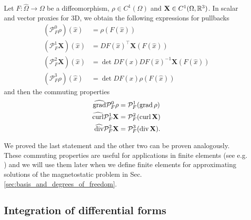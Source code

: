 \documentclass[../master_thesis.tex]{subfiles}
\begin{document}
\begin{proposition}\label{prop:pullback_and_commutativity_3D}
    Let $F: \hat{\Omega} \rightarrow \Omega$ be a diffeomorphism, 
    $\rho \in C^1(\Omega)$ and $\mathbf{X} \in C^1(\Omega, \mathbb{R}^3)$.
    In scalar and vector proxies for 3D, we obtain the following expressions for 
    pullbacks
    \begin{align*}
        (\mathcal{P}^0_F \rho)(\hat{x}) &= \rho(F(\hat{x}))
        \\ (\mathcal{P}^1_F \mathbf{X})(\hat{x}) &= DF(\hat{x})^\top \mathbf{X}(F(\hat{x}))
        \\ (\mathcal{P}^2_F \mathbf{X})(\hat{x}) &= \det DF(\hat{x}) DF(\hat{x})^{-1} \mathbf{X}(F(\hat{x}))
        \\ (\mathcal{P}^3_F \rho)(\hat{x}) &= \det DF(\hat{x}) \rho(F(\hat{x}))
    \end{align*}
    and then the commuting properties
    \begin{align*}
        \widehat{\operatorname{grad}} \mathcal{P}^0_F \rho &= \mathcal{P}^1_F (\operatorname{grad} \rho)
        \\ \widehat{\mathbf{\operatorname{curl}}} \mathcal{P}^1_F \mathbf{X} &= \mathcal{P}^2_F (\operatorname{curl} \mathbf{X})
        \\ \widehat{\operatorname{div}} \mathcal{P}^2_F \mathbf{X} &= \mathcal{P}^3_F (\operatorname{div} \mathbf{X}).
    \end{align*}
\end{proposition}
We proved the last statement and the other two can be proven analogously. 
These commuting properties are useful for applications in finite elements
(see e.g. \cite[Sec.\,14.3]{ern_guermond}) and we will use them later when we 
define finite elements 
for approximating solutions of the magnetostatic problem in Sec.\,\ref{sec:basis_and_degrees_of_freedom}.





\subsection{Integration of differential forms}\label{sec:integration_of_differential_forms}
\end{document}
